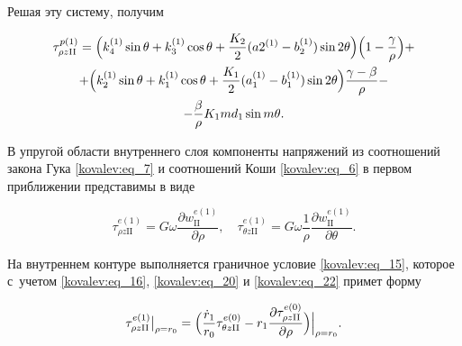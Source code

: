 Решая эту систему, получим

 \begin{multline}

\label{kovalev:eq_35}

  \tau_{\rho z\mathrm{II}}^{p(1)}=\Bigl(k_4^{(1)}\sin\theta+k_3^{(1)}\cos\theta+

  \frac{K_2}{2} (a2^{(1)}-b_2^{(1)})\sin2\theta\Bigr)

  \Bigl(1-\frac{\gamma}{\rho}\Bigr)+\\

  +\Bigl(k_2^{(1)}\sin\theta+k_1^{(1)}\cos\theta+

  \dfrac{K_1}{2}(a_1^{(1)}-b_1^{(1)})\sin2\theta\Bigr)\frac{\gamma-\beta}{\rho}-\\

  -\frac{\beta}{\rho}K_1 md_1\sin m\theta.

 \end{multline}



В упругой области внутреннего слоя компоненты напряжений  из соотношений закона Гука \eqref{kovalev:eq_7} и соотношений Коши \eqref{kovalev:eq_6} в первом приближении представимы в виде

 \begin{equation}\label{kovalev:eq_36}

  \tau_{\rho z\mathrm{II}}^{e(1)}=G\omega\frac{\partial w_{\mathrm{II}}^{e(1)}}{\partial\rho}, \quad

  \tau_{\theta z\mathrm{II}}^{e(1)}=G\omega\frac1{\rho}\frac{\partial w_{\mathrm{II}}^{e(1)}}{\partial\theta}.

 \end{equation}

 

На внутреннем контуре выполняется граничное условие \eqref{kovalev:eq_15}, которое с~учетом \eqref{kovalev:eq_16}, \eqref{kovalev:eq_20} и \eqref{kovalev:eq_22} примет форму

  \begin{equation}\label{kovalev:eq_37}

    \tau_{\rho z\mathrm{II}}^{e(1)}\bigr|_{\rho=r_0}=

    \Bigl(\frac{\dot{r}_1}{r_0}\tau_{\theta z\mathrm{II}}^{e(0)}-

    r_1\dfrac{\partial\tau_{\rho z\mathrm{II}}^{e(0)}}{\partial\rho}\Bigr)\Bigr|_{\rho=r_0}.

  \end{equation}



